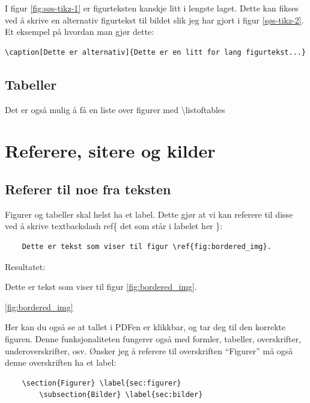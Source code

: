        I figur \ref{fig:søs-tikz-1} er figurteksten kanskje litt i lengste laget. Dette kan fikses ved å skrive en alternativ figurtekst til bildet slik jeg har gjort i figur \ref{søs-tikz-2}.
        Et eksempel på hvordan man gjør dette:
        \begin{verbatim}
\caption[Dette er alternativ]{Dette er en litt for lang figurtekst...}
        \end{verbatim}
        
    \subsection{Tabeller}
        Det er også mulig å få en liste over figurer med \textbackslash listoftables
        \listoftables 
        

\section{Referere, sitere og kilder}
    \subsection{Referer til noe fra teksten}
        Figurer og tabeller skal helst ha et label. Dette gjør at vi kan referere til disse ved å skrive textbackslash ref\{ det som står i labelet her \}:
        \begin{verbatim}
    Dette er tekst som viser til figur \ref{fig:bordered_img}.
        \end{verbatim}
        Resultatet:
        
        Dette er tekst som viser til figur \ref{fig:bordered_img}.
        
        \autoref{fig:bordered_img}
        
        Her kan du også se at tallet i PDFen er klikkbar, og tar deg til den korrekte figuren. Denne funksjonaliteten fungerer også med formler, tabeller, overskrifter, underoverskrifter, osv. Ønsker jeg å referere til overskriften ``Figurer'' må også denne overskriften ha et label:
        \begin{verbatim}
    \section{Figurer} \label{sec:figurer}
        \subsection{Bilder} \label{sec:bilder}
        \end{verbatim}
        
